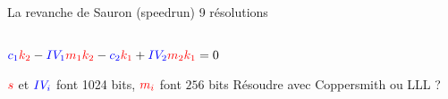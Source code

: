 \begin{frame}{La revanche de Sauron \FiveStar \FiveStar (speedrun) \hfill 9 résolutions}
\begin{columns}[c]
\begin{outline}
                \vspace{0.3cm}
                
                \2 $\textcolor{blue}{c_1}\textcolor{red}{k_2} - \textcolor{blue}{IV_1}\textcolor{red}{m_1}\textcolor{red}{k_2} - \textcolor{blue}{c_2}\textcolor{red}{k_1} +  \textcolor{blue}{IV_2}\textcolor{red}{m_2}\textcolor{red}{k_1} =  0$

                \pause
                \vspace{0.3cm}

                \pause 
                
                \2 $\textcolor{red}{s}$ et $\textcolor{blue}{IV_i}$ font 1024 bits, $\textcolor{red}{m_i}$ font $256$ bits
            \1 Résoudre avec Coppersmith ou LLL ?
           \end{outline}
    \end{columns}
\end{frame}



